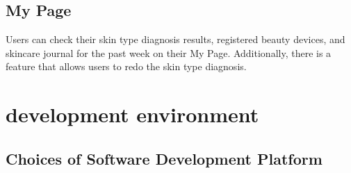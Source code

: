 \documentclass[conference]{IEEEtran}
\begin{document}
\subsection{My Page}
Users can check their skin type diagnosis results, registered beauty devices, and skincare journal for the past week on their My Page. Additionally, there is a feature that allows users to redo the skin type diagnosis.\\

\section{development environment}
\subsection{Choices of Software Development Platform}
\end{document}
